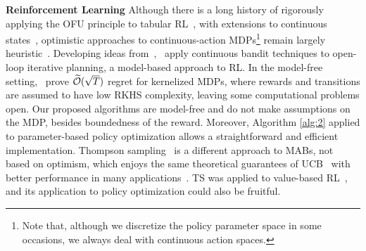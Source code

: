\documentclass{article}
\begin{document}
\textbf{Reinforcement Learning} Although there is a long history of rigorously applying the OFU principle to tabular RL~\citep{kearns2002near,brafman2002r,strehl2009reinforcement,jaksch2010near,lattimore2014near,dann2015sample,dann2017unifying,jin2018q,jungseul2018exploration}, with extensions to continuous states~\citep{ortner2012online,lakshmanan2015improved,bellemare2016unifying}, optimistic approaches to continuous-action MDPs\footnote{Note that, although we discretize the policy parameter space in some occasions, we always deal with continuous action spaces.} remain largely heuristic~\cite{houthooft2016vime,haarnoja2017reinforcement,haarnoja2018soft}. Developing ideas from~\citet{bubeck2010open},~\citet{weinstein2012bandit} apply continuous bandit techniques to open-loop iterative planning, a model-based approach to RL. In the model-free setting,~\citet{sayak2018online} prove $\widetilde{\mathcal{O}}(\sqrt{T})$ regret for kernelized MDPs, where rewards and transitions are assumed to have low RKHS complexity, leaving some computational problems open. Our proposed algorithms are model-free and do not make assumptions on the MDP, besides boundedness of the reward. Moreover, Algorithm \ref{alg:2} applied to parameter-based policy optimization allows a straightforward and efficient implementation.
Thompson sampling~\citep[TS,][]{thompson1933likelihood} is a different approach to MABs, not based on optimism, which enjoys the same theoretical guarantees of UCB~\citep{kaufmann2012thompson} with better performance in many applications~\citep{chapelle2011empirical}. TS was applied to value-based RL~\citep[\eg][]{osband2013more}, and its application to policy optimization could also be fruitful.
\end{document}

